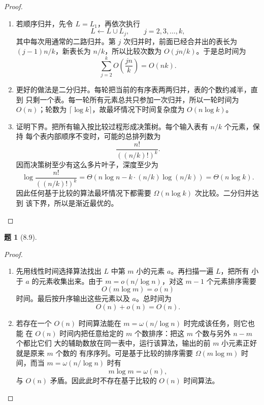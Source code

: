 \documentclass[11pt, a4paper]{article}
\newtheorem{problem}{题}
\begin{document}
\begin{proof}
    \begin{enumerate}[label=(\arabic*)]
        \item 若顺序归并，先令 $L=L_1$，再依次执行
        \[
            L\leftarrow L\cup L_j,\qquad j=2,3,\ldots,k,
        \]
        其中每次用通常的二路归并。第 $j$ 次归并时，前面已经合并出的表长为
        $(j-1)n/k$，新表长为 $n/k$，所以比较次数为 $O(jn/k)$。于是总时间为
        \[
            \sum_{j=2}^k O\left(\frac{jn}{k}\right)=O(nk).
        \]
        \item 更好的做法是二分归并。每轮把当前的有序表两两归并，表的个数约减半，直到
        只剩一个表。每一轮所有元素总共只参加一次归并，所以一轮时间为 $O(n)$；轮数为
        $\lceil\log k\rceil$，故最坏情况下时间复杂度为 $O(n\log k)$。
        \item 证明下界。把所有输入按比较过程形成决策树。每个输入表有 $n/k$ 个元素，保持
        每个表内部顺序不变时，可能的总排列数为
        \[
            \frac{n!}{((n/k)!)^k}.
        \]
        因而决策树至少有这么多片叶子，深度至少为
        \[
            \log\frac{n!}{((n/k)!)^k}
            =\Theta(n\log n-k\cdot (n/k)\log(n/k))
            =\Theta(n\log k).
        \]
        因此任何基于比较的算法最坏情况下都需要 $\Omega(n\log k)$ 次比较。二分归并达到
        该下界，所以是渐近最优的。
    \end{enumerate}
\end{proof}

\vspace{1em}

\begin{problem}[8.9]
\end{problem}

\begin{proof}
    \begin{enumerate}[label=(\arabic*)]
        \item 先用线性时间选择算法找出 $L$ 中第 $m$ 小的元素 $a$。再扫描一遍 $L$，把所有
        小于 $a$ 的元素收集出来。由于 $m=o(n/\log n)$，对这 $m-1$ 个元素排序需要
        \[
            O(m\log m)=o(n)
        \]
        时间。最后按升序输出这些元素以及 $a$。总时间为
        \[
            O(n)+o(n)=O(n).
        \]

        \item 若存在一个 $O(n)$ 时间算法能在 $m=\omega(n/\log n)$ 时完成该任务，则它也能
        在 $O(n)$ 时间内把任意给定的 $m$ 个数排序：把这 $m$ 个数与另外 $n-m$ 个都比它们
        大的辅助数放在同一表中，运行该算法，输出的前 $m$ 小元素正好就是原来 $m$ 个数的
        有序序列。可是基于比较的排序需要 $\Omega(m\log m)$ 时间，而当
        $m=\omega(n/\log n)$ 时有
        \[
            m\log m=\omega(n),
        \]
        与 $O(n)$ 矛盾。因此此时不存在基于比较的 $O(n)$ 时间算法。
    \end{enumerate}
\end{proof}
\end{document}
